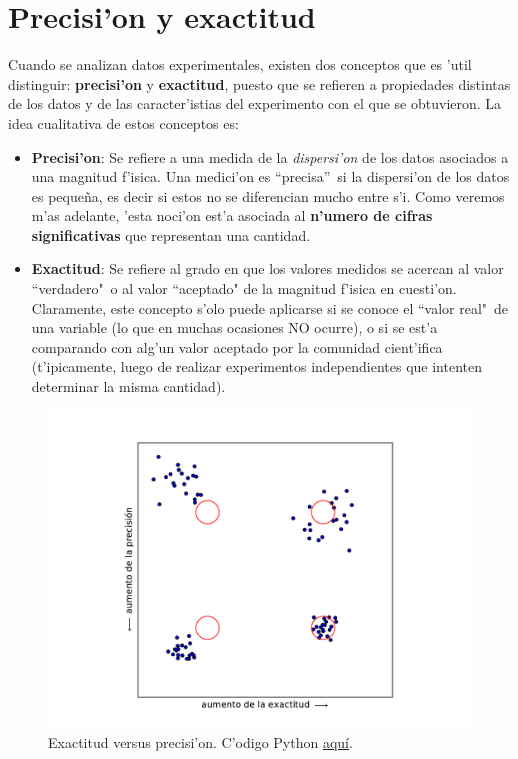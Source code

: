 \section{Precisi'on y exactitud}
Cuando se analizan datos experimentales, existen dos conceptos que es 'util distinguir: \textbf{precisi'on} y \textbf{exactitud}, puesto que se refieren a propiedades distintas de los datos y de las caracter'istias del experimento con el que se obtuvieron. La idea cualitativa de estos conceptos es:
\begin{itemize}
\item \textbf{Precisi'on}: Se refiere a una medida de la \textit{dispersi'on} de los datos asociados a una magnitud f'isica. Una medici'on es ``precisa''\, si la dispersi'on de los datos es peque\~na, es decir si estos no se diferencian mucho entre s'i. Como veremos m'as adelante, 'esta noci'on est'a asociada al \textbf{n'umero de cifras significativas} que representan una cantidad.
\item \textbf{Exactitud}: Se refiere al grado en que los valores medidos se acercan al valor ``verdadero"\, o al valor ``aceptado" de la magnitud f'isica en cuesti'on. Claramente, este concepto s'olo puede aplicarse si se conoce el ``valor real"\, de una variable (lo que en muchas ocasiones NO ocurre), o si se est'a comparando con alg'un valor aceptado por la comunidad cient'ifica (t'ipicamente, luego de realizar experimentos independientes que intenten determinar la misma cantidad).
\end{itemize}

\begin{figure}[h!]
\begin{center}
\includegraphics[width=12cm]{figs/fig-ex-vs-prec.pdf}
\caption{Exactitud versus precisi'on. C'odigo Python \href{https://github.com/gfrubi/Lab/blob/master/python/fig-ex-vs-prec.py}{aqu\'i}.}
\end{center}
\end{figure}


